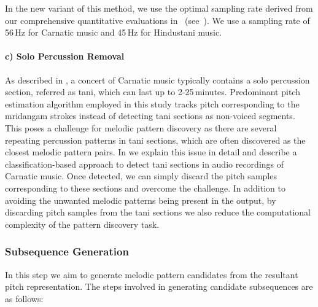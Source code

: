 In the new variant of this method, we use the optimal sampling rate derived from our comprehensive quantitative evaluations in~\cite{gulati_ICASSP2015} (see~). We use a sampling rate of 56\,Hz for Carnatic music and 45\,Hz for Hindustani music.  



\paragraph{c) Solo Percussion Removal} 

As described in , a concert of Carnatic music typically contains a solo percussion section, referred as \gls{tani}, which can last up to 2-25\,minutes. Predominant pitch estimation algorithm employed in this study tracks pitch corresponding to the \gls{mridangam} strokes instead of detecting \gls{tani} sections as non-voiced segments. This poses a challenge for melodic pattern discovery as there are several repeating percussion patterns in \gls{tani} sections, which are often discovered as the closest melodic pattern pairs. In  we explain this issue in detail and describe a classification-based approach to detect \gls{tani} sections in audio recordings of Carnatic music. Once detected, we can simply discard the pitch samples corresponding to these sections and overcome the challenge. In addition to avoiding the unwanted melodic patterns being present in the output, by discarding pitch samples from the \gls{tani} sections we also reduce the computational complexity of the pattern discovery task.


\subsubsection{Subsequence Generation}
\label{sec:subsequencegeneration}

In this step we aim to generate melodic pattern candidates from the resultant pitch representation. The steps involved in generating candidate subsequences are as follows:

